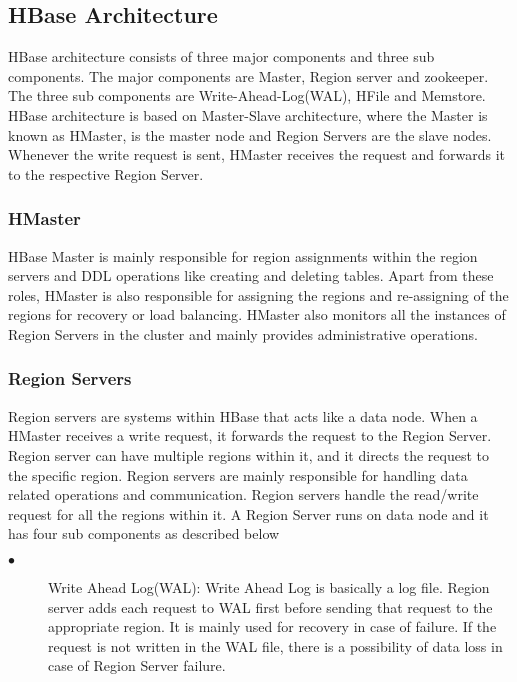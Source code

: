 \documentclass[11pt,a4paper,bibtotoc,idxtotoc,headsepline,footsepline,footexclude,BCOR12mm,DIV13]{scrbook}
\begin{document}
\newpage
\subsection{HBase Architecture}
\label{HBase Architecture}
HBase architecture consists of three major components and three sub components. The major components are Master, Region server and zookeeper. The three sub components are Write-Ahead-Log(WAL), HFile and Memstore\cite{hbase:insights}. HBase architecture is based on Master-Slave architecture, where the Master is known as HMaster, is the master node and Region Servers are the slave nodes. Whenever the write request is sent, HMaster receives the request and forwards it to the respective Region Server\cite{hbase:insights}. 

\subsubsection{HMaster}
\label{hmaster}
HBase Master is mainly responsible for region assignments within the region servers and DDL operations like creating and deleting tables\cite{hbase:architecture}. Apart from these roles, HMaster is also responsible for assigning the regions and re-assigning of the regions for recovery or load balancing\cite{hbase:architecture}. HMaster also monitors all the instances of Region Servers in the cluster\cite{hbase:architecture} and mainly provides administrative operations.

\subsubsection{Region Servers}
\label{region serves}
Region servers are systems within HBase that acts like a data node\cite{hbase:insights}. When a HMaster receives a write request, it forwards the request to the Region Server. Region server can have multiple regions within it, and it directs the request to the specific region. Region servers are mainly responsible for handling data related operations and communication. Region servers handle the read/write request for all the regions within it. 
A Region Server runs on data node and it has four sub components as described below\cite{hbase:architecture}
\begin{description}
	\item[$\bullet$]  Write Ahead Log(WAL): Write Ahead Log is basically a log file. Region server adds each request to WAL first before sending that request to the appropriate region. It is mainly used for recovery in case of failure\cite{hbase:insights}. If the request is not written in the WAL file, there is a possibility of data loss in case of Region Server failure.
\end{description}
\end{document}
